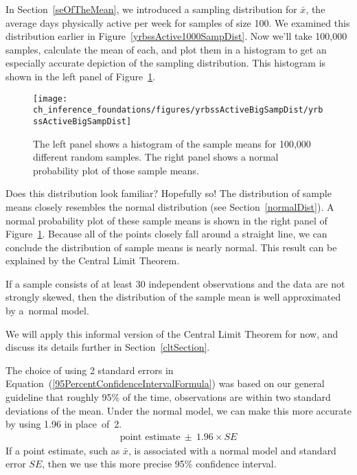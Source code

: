 In Section~\ref{seOfTheMean}, we introduced a sampling distribution for $\bar{x}$, the average days physically active per week for samples of size 100. We examined this distribution earlier in Figure~\ref{yrbssActive1000SampDist}. Now we'll take 100,000 samples, calculate the mean of each, and plot them in a histogram to get an especially accurate depiction of the sampling distribution. This histogram is shown in the left panel of Figure~\ref{yrbssActiveBigSampDist}.

\begin{figure}[hht]
   \centering
   \texttt{[image: ch\_inference\_foundations/figures/yrbssActiveBigSampDist/yrbssActiveBigSampDist]}
   \caption{The left panel shows a histogram of the sample means for 100,000 different random samples. The right panel shows a normal probability plot of those sample means.}
   \label{yrbssActiveBigSampDist}
\end{figure}

Does this distribution look familiar? Hopefully so! The distribution of sample means closely resembles the normal distribution (see Section~\ref{normalDist}). A normal probability plot of these sample means is shown in the right panel of Figure~\ref{yrbssActiveBigSampDist}. Because all of the points closely fall around a straight line, we can conclude the distribution of sample means is nearly normal. This result can be explained by the Central Limit Theorem.

\begin{termBox}{
If a sample consists of at least 30 independent observations and the data are not strongly skewed, then the distribution of the sample mean is well approximated by a~normal model.}
\end{termBox}

We will apply this informal version of the Central Limit Theorem for now, and discuss its details further in Section~\ref{cltSection}.

The choice of using 2 standard errors in Equation~(\ref{95PercentConfidenceIntervalFormula}) was based on our general guideline that roughly 95\% of the time, observations are within two standard deviations of the mean. Under the normal model, we can make this more accurate by using 1.96 in place~of~2.
\begin{eqnarray}
\text{point estimate}\ \pm\ 1.96\times SE
\label{95PercentCIWhenUsingNormalModel}
\end{eqnarray}
If a point estimate, such as $\bar{x}$, is associated with a normal model and standard error $SE$, then we use this more precise 95\% confidence interval.


